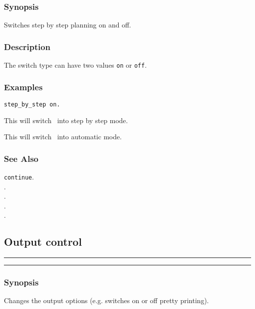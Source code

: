 \subsubsection*{Synopsis}
Switches step by step planning on and off.

\subsubsection*{Description}
The switch type can have two values {\tt on}
or {\tt off}.  

\subsubsection*{Examples}
{\tt step\_by\_step on.}

\noindent This will switch \lclam\ into step by step mode.


\noindent This will switch \lclam\ into automatic mode.

\subsubsection*{See Also}
{\tt continue}. \\
. \\
. \\
. \\
. \\

\subsection{Output control}

\vspace{2mm}
\hrule
\vspace{2mm}
\begin{Large}
\end{Large}
\vspace{2mm}
\hrule
\vspace{2mm}


\subsubsection*{Synopsis}
Changes the output options (e.g. switches on or off pretty printing).

